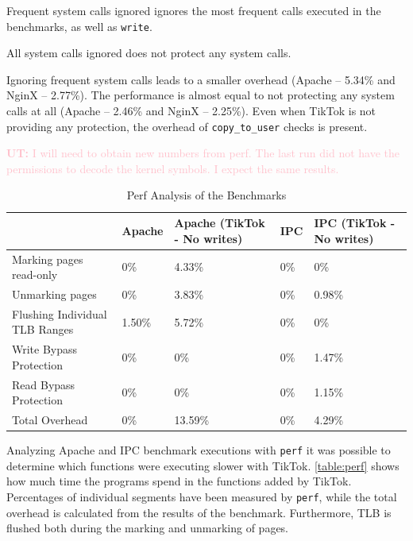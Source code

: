 \documentclass[conference]{IEEEtran}
\newcommand{\uros}[1]{\textcolor{pink}{\textbf{UT:} #1}}
\newcommand{\sysname}{TikTok}
\begin{document}
\begin{LaTeXdescription}
  \item[Frequent system calls ignored] ignores the most frequent calls executed in the benchmarks, as well as \texttt{write}.
  \item[All system calls ignored] does not protect any system calls.
\end{LaTeXdescription}

Ignoring frequent system calls leads to a smaller overhead (Apache -- 5.34\% and
NginX -- 2.77\%). The performance is almost equal to not protecting any system
calls at all (Apache -- 2.46\% and NginX -- 2.25\%). Even when \sysname
is not providing any protection, the overhead of \texttt{copy\_to\_user} checks
is present.

\uros{I will need to obtain new numbers from perf. The last run did not have the
permissions to decode the kernel symbols. I expect the same results.}

\begin{table}[]
  \label{table:perf}
  \centering
  \begin{tabular}{|l|l|l|l|l|}
  \hline
                                 & Apache & Apache (\sysname{} - No writes) & IPC & IPC (\sysname{} - No writes)\\ \hline
  Marking pages read-only        & 0\%    & 4.33\%          & 0\% & 0\%         \\ \hline
  Unmarking pages                & 0\%    & 3.83\%          & 0\% & 0.98\%      \\ \hline
  Flushing Individual TLB Ranges & 1.50\% & 5.72\%          & 0\% & 0\%         \\ \hline
  Write Bypass Protection        & 0\%    & 0\%             & 0\% & 1.47\%      \\ \hline
  Read Bypass Protection         & 0\%    & 0\%             & 0\% & 1.15\%      \\ \hline
  Total Overhead                 & 0\%    & 13.59\%         & 0\% & 4.29\%      \\ \hline
  \end{tabular}
  \caption{Perf Analysis of the Benchmarks}
\end{table}

Analyzing Apache and IPC benchmark executions with \texttt{perf} it was possible
to determine which functions were executing slower with \sysname{}.
\autoref{table:perf} shows how much time the programs spend in the functions
added by \sysname. Percentages of individual segments have been measured by
\texttt{perf}, while the total overhead is calculated from the results of the
benchmark. Furthermore, TLB is flushed both during the marking and unmarking of
pages.
\end{document}
